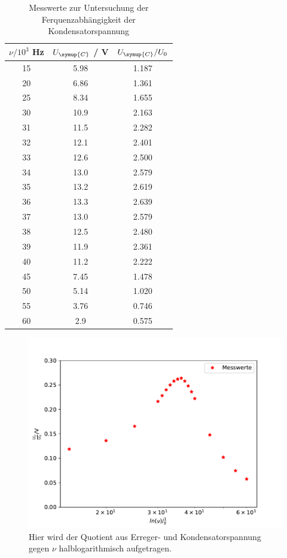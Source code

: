 \begin{table}
  \centering
  \caption{Messwerte zur Untersuchung der Ferquenzabhängigkeit der Kondensatorspannung}
  \label{tab:2}
  \begin{tabular}{c c c}
    \toprule
    {$\nu / 10^3$ Hz} & {$U_\symup{C}$ / V} & {$U_\symup{C} / U_0$} \\
    \midrule
    15  &  5.98  &  1.187 \\
    20  &  6.86  &  1.361 \\
    25  &  8.34  &  1.655 \\
    30  &  10.9  &  2.163 \\
    31  &  11.5  &  2.282 \\
    32  &  12.1  &  2.401 \\
    33  &  12.6  &  2.500 \\
    34  &  13.0  &  2.579 \\
    35  &  13.2  &  2.619 \\
    36  &  13.3  &  2.639 \\
    37  &  13.0  &  2.579 \\
    38  &  12.5  &  2.480 \\
    39  &  11.9  &  2.361 \\
    40  &  11.2  &  2.222 \\
    45  &  7.45  &  1.478 \\
    50  &  5.14  &  1.020 \\
    55  &  3.76  &  0.746 \\
    60  &  2.9   &  0.575 \\
    \bottomrule
  \end{tabular}
\end{table}

 \begin{figure}
  \centering
  \includegraphics[scale = 0.7]{plotC1.pdf}
  \caption{Hier wird der Quotient aus Erreger- und Kondensatorspannung gegen $\nu$ halblogarithmisch aufgetragen.}
  \label{Abb:3}
\end{figure}

